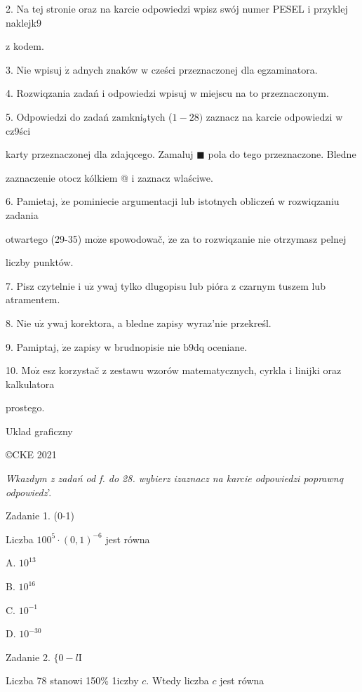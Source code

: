 \documentclass[a4paper,12pt]{article}
\begin{document}
2. Na tej stronie oraz na karcie odpowiedzi wpisz swój numer PESEL i przyklej naklejk9

z kodem.

3. Nie wpisuj $\dot{\mathrm{z}}$ adnych znaków w cześci przeznaczonej dla egzaminatora.

4. Rozwiqzania zadań i odpowiedzi wpisuj w miejscu na to przeznaczonym.

5. Odpowiedzi do zadań $\mathrm{z}\mathrm{a}\mathrm{m}\mathrm{k}\mathrm{n}\mathrm{i}_{9}$tych ($1-28)$ zaznacz na karcie odpowiedzi w cz9ści

karty przeznaczonej dla zdajqcego. Zamaluj $\blacksquare$ pola do tego przeznaczone. Bledne

zaznaczenie otocz kólkiem @ i zaznacz wlaściwe.

6. Pamietaj, $\dot{\mathrm{z}}\mathrm{e}$ pominiecie argumentacji lub istotnych obliczeń w rozwiqzaniu zadania

otwartego (29-35) $\mathrm{m}\mathrm{o}\dot{\mathrm{z}}\mathrm{e}$ spowodowač, $\dot{\mathrm{z}}\mathrm{e}$ za to rozwiqzanie nie otrzymasz pelnej

liczby punktów.

7. Pisz czytelnie i $\mathrm{u}\dot{\mathrm{z}}$ ywaj tylko dlugopisu lub pióra z czarnym tuszem lub atramentem.

8. Nie $\mathrm{u}\dot{\mathrm{z}}$ ywaj korektora, a bledne zapisy wyraz'nie przekreśl.

9. Pamiptaj, $\dot{\mathrm{z}}\mathrm{e}$ zapisy w brudnopisie nie $\mathrm{b}9\mathrm{d}\mathrm{q}$ oceniane.

10. $\mathrm{M}\mathrm{o}\dot{\mathrm{z}}$ esz korzystač z zestawu wzorów matematycznych, cyrkla i linijki oraz kalkulatora

prostego.

Uklad graficzny

\copyright CKE 2021




{\it Wkazdym z zadań od f. do 28. wybierz izaznacz na karcie odpowiedzi poprawnq odpowiedz}'.

Zadanie 1. (0-1)

Liczba $100^{5}\cdot(0,1)^{-6}$ jest równa

A. $10^{13}$

B. $10^{16}$

C. $10^{-1}$

D. $10^{-30}$

Zadanie 2. $\{0-l\mathrm{I}$

Liczba 78 stanowi 150\% 1iczby $c$. Wtedy liczba $c$ jest równa
\end{document}
